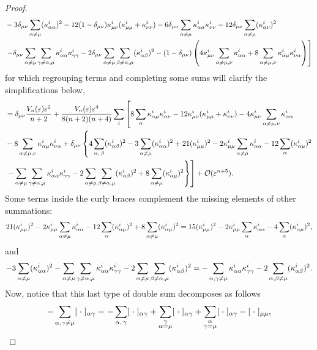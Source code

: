 \documentclass[letterpaper, reqno, 11pt]{amsart}
\theoremstyle{definition}
\theoremstyle{remark}
\numberwithin{equation}{section}
\begin{document}
\begin{proof}
\begin{align*}
& -3\delta_{\mu\nu}\sum_{\alpha\neq\mu}(\kappa^i_{\alpha\alpha})^2 -12(1-\delta_{\mu\nu})\kappa^i_{\mu\nu}(\kappa^i_{\mu\mu}+\kappa^i_{\nu\nu}) -6\delta_{\mu\nu}\sum_{\alpha\neq\mu}\kappa^i_{\alpha\alpha}\kappa^i_{\nu\nu} -12\delta_{\mu\nu}\sum_{\alpha\neq\mu}(\kappa^i_{\alpha\nu})^2  \\
& \left.-\delta_{\mu\nu}\sum_{\alpha\neq\mu}\sum_{\gamma\neq\alpha,\mu}\kappa^i_{\alpha\alpha}\kappa^i_{\gamma\gamma} -2\delta_{\mu\nu}\sum_{\alpha\neq\mu}\sum_{\beta\neq\alpha,\mu}(\kappa^i_{\alpha\beta})^2 - (1-\delta_{\mu\nu})\left( 4\kappa^i_{\mu\nu}\sum_{\alpha\neq\mu,\nu}\kappa^i_{\alpha\alpha} + 8\sum_{\alpha\neq\mu,\nu}\kappa^i_{\alpha\mu}\kappa^i_{\nu\alpha} \right)\right]
\end{align*}
for which regrouping terms and completing some sums will clarify the simplifications below,
\begin{align*}
& = \delta_{\mu\nu}\frac{V_n(\varepsilon)\varepsilon^2}{n+2} + \frac{V_n(\varepsilon)\varepsilon^{4}}{8(n+2)(n+4)} \sum_{i}\left[ 8\sum_{\alpha}\kappa^i_{\alpha\mu}\kappa^i_{\alpha\nu} - 12\kappa^i_{\mu\nu}(\kappa^i_{\mu\mu}+\kappa^i_{\nu\nu}) - 4\kappa^i_{\mu\nu}\sum_{\alpha\neq\mu,\nu}\kappa^i_{\alpha\alpha}  \right. \\
& - 8\sum_{\alpha\neq\mu,\nu}\kappa^i_{\alpha\mu}\kappa^i_{\nu\alpha} + \delta_{\mu\nu}\left\{ 4\sum_{\alpha,\,\beta}(\kappa^i_{\alpha\beta})^2 -3\sum_{\alpha\neq\mu}(\kappa^i_{\alpha\alpha})^2 + 21(\kappa^i_{\mu\mu})^2 -2\kappa^i_{\mu\mu}\sum_{\alpha\neq\mu}\kappa^i_{\alpha\alpha} -12\sum_{\alpha}(\kappa^i_{\alpha\mu})^2 \right. \\
& \left.\left. -\sum_{\alpha\neq\mu}\sum_{\gamma\neq\alpha,\mu}\kappa^i_{\alpha\alpha}\kappa^i_{\gamma\gamma} -2\sum_{\alpha\neq\mu}\sum_{\beta\neq\alpha,\mu}(\kappa^i_{\alpha\beta})^2 + 8\sum_{\alpha\neq\mu}(\kappa^i_{\alpha\mu})^2 \right\} \right] +{\mathcal O}(\varepsilon^{n+5}).
\end{align*}
Some terms inside the curly braces complement the missing elements of other summations:
$$
21(\kappa^i_{\mu\mu})^2 -2\kappa^i_{\mu\mu}\sum_{\alpha\neq\mu}\kappa^i_{\alpha\alpha} -12\sum_{\alpha}(\kappa^i_{\alpha\mu})^2 +8\sum_{\alpha\neq\mu}(\kappa^i_{\alpha\mu})^2 = 15(\kappa^i_{\mu\mu})^2 -2\kappa^i_{\mu\mu}\sum_{\alpha}\kappa^i_{\alpha\alpha}-4\sum_{\alpha}(\kappa^i_{\alpha\mu})^2,
$$
and
$$
-3\sum_{\alpha\neq\mu}(\kappa^i_{\alpha\alpha})^2 -\sum_{\alpha\neq\mu}\sum_{\gamma\neq\alpha,\mu}\kappa^i_{\alpha\alpha}\kappa^i_{\gamma\gamma} -2\sum_{\alpha\neq\mu}\sum_{\beta\neq\alpha,\mu}(\kappa^i_{\alpha\beta})^2 = -\sum_{\alpha,\gamma\neq\mu}\kappa^i_{\alpha\alpha}\kappa^i_{\gamma\gamma} -2\sum_{\alpha,\beta\neq\mu}(\kappa^i_{\alpha\beta})^2.
$$
Now, notice that this last type of double sum decomposes as follows
$$
-\sum_{\alpha,\gamma\neq\mu}[\;\cdot\;]_{\alpha\gamma} = -\sum_{\alpha,\,\gamma}[\;\cdot\;]_{\alpha\gamma} +\sum_{\substack{\gamma \\ \alpha=\mu}}[\;\cdot\;]_{\alpha\gamma}+\sum_{\substack{\alpha \\ \gamma=\mu}}[\;\cdot\;]_{\alpha\gamma} -[\;\cdot\;]_{\mu\mu},
$$
\end{proof}
\end{document}
